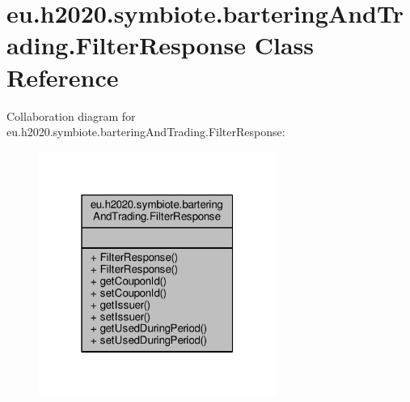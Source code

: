 \hypertarget{classeu_1_1h2020_1_1symbiote_1_1barteringAndTrading_1_1FilterResponse}{}\section{eu.\+h2020.\+symbiote.\+bartering\+And\+Trading.\+Filter\+Response Class Reference}
\label{classeu_1_1h2020_1_1symbiote_1_1barteringAndTrading_1_1FilterResponse}


Collaboration diagram for eu.\+h2020.\+symbiote.\+bartering\+And\+Trading.\+Filter\+Response\+:
\nopagebreak
\begin{figure}[H]
\begin{center}
\leavevmode
\includegraphics[width=220pt]{classeu_1_1h2020_1_1symbiote_1_1barteringAndTrading_1_1FilterResponse__coll__graph}
\end{center}
\end{figure}
